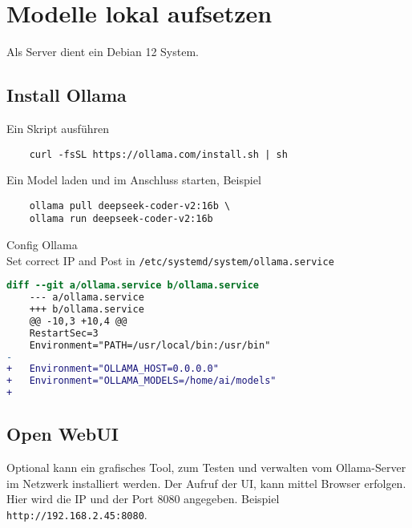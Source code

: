
\section{Modelle lokal aufsetzen}
Als Server dient ein Debian 12 System.

\subsection{Install Ollama}
Ein Skript ausführen
\begin{verbatim}
	curl -fsSL https://ollama.com/install.sh | sh
\end{verbatim}

Ein Model laden und im Anschluss starten, Beispiel
\begin{verbatim}
	ollama pull deepseek-coder-v2:16b \
	ollama run deepseek-coder-v2:16b
\end{verbatim}


Config Ollama\\
Set correct IP and Post in \texttt{/etc/systemd/system/ollama.service}

\begin{lstlisting}[language=diff,caption={Ollama Hostanpasssng für Netzwerkbetrieb}]
	diff --git a/ollama.service b/ollama.service
	--- a/ollama.service
	+++ b/ollama.service
	@@ -10,3 +10,4 @@
	RestartSec=3
	Environment="PATH=/usr/local/bin:/usr/bin"
-   
+   Environment="OLLAMA_HOST=0.0.0.0"
+   Environment="OLLAMA_MODELS=/home/ai/models"
+   
\end{lstlisting}



\subsection{Open WebUI}
Optional kann ein grafisches Tool, zum Testen und verwalten vom Ollama-Server im Netzwerk installiert werden. Der Aufruf der UI, kann mittel Browser erfolgen. Hier wird die IP und der Port 8080 angegeben. Beispiel \texttt{http://192.168.2.45:8080}.

